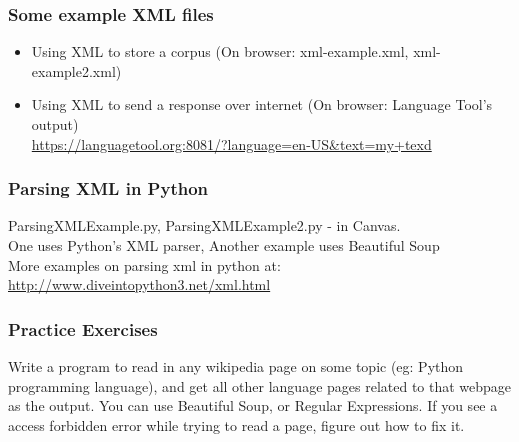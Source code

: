 \documentclass{beamer}
\begin{document}
\begin{frame}
\frametitle{Some example XML files}
\begin{itemize}
\item Using XML to store a corpus (On browser: xml-example.xml, xml-example2.xml)
\item Using XML to send a response over internet (On browser: Language Tool's output) \\ \url{https://languagetool.org:8081/?language=en-US&text=my+texd}
\end{itemize}
\end{frame}

\begin{frame}
\frametitle{Parsing XML in Python}
ParsingXMLExample.py, ParsingXMLExample2.py - in Canvas.
\\ One uses Python's XML parser, Another example uses Beautiful Soup
\\ More examples on parsing xml in python at: \url{http://www.diveintopython3.net/xml.html}
\end{frame}

\begin{frame}
\frametitle{Practice Exercises}
 Write a program to read in any wikipedia page on some topic (eg: Python programming language), and get all other language pages related to that webpage as the output. You can use Beautiful Soup, or Regular Expressions. 
 If you see a access forbidden error while trying to read a page, figure out how to fix it. 
\end{frame}
\end{document}
